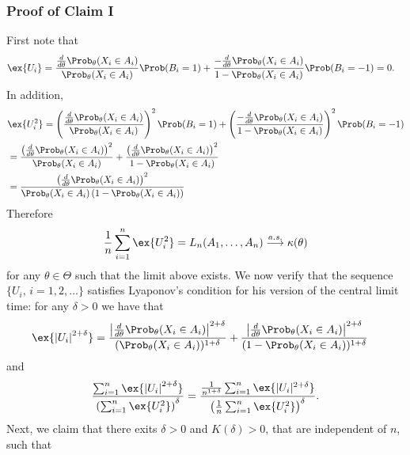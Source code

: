 \subsubsection*{Proof of Claim I}
First note that 
\begin{align*}
\ex{U_i} & = 
 \frac{\frac{d}{d\theta} \Prob_{\theta}(X_i \in A_i)}{\Prob_{\theta}(X_i \in A_i)}   \Prob (B_i=1)   + 
 \frac{-\frac{d}{d\theta} \Prob_{\theta}(X_i \in A_i)}{1-\Prob_{\theta}(X_i \in A_i)}   \Prob (B_i=-1)  = 0. 
\end{align*}
In addition,
\begin{align*}
& \ex{ U_i^2} = 
\left( \frac{\frac{d}{d\theta} \Prob_{\theta}(X_i \in A_i)}{\Prob_{\theta}(X_i \in A_i)}  \right)^2  \Prob (B_i=1)   + 
\left( \frac{-\frac{d}{d\theta} \Prob_{\theta}(X_i \in A_i)}{1-\Prob_{\theta}(X_i \in A_i)}  \right)^2 \Prob (B_i=-1) \\
& =
 \frac{ \left(\frac{d}{d\theta} \Prob_{\theta}(X_i \in A_i) \right)^2}{\Prob_{\theta}(X_i \in A_i)} +  
  \frac{ \left(\frac{d}{d\theta} \Prob_{\theta}(X_i \in A_i) \right)^2}{1-\Prob_{\theta}(X_i \in A_i)} \\
 & =  
  \frac{ \left(\frac{d}{d\theta} \Prob_{\theta}(X_i \in A_i) \right)^2}{\Prob_{\theta}(X_i \in A_i) \left(1-\Prob_{\theta}(X_i \in A_i) \right)} 
\end{align*}
Therefore
\[
\frac{1}{n} \sum_{i=1}^n \ex{ U_i^2} = L_n(A_1,\ldots,A_n) \overset{a.s.}{\longrightarrow} \kappa(\theta)
\]
for any $\theta \in \Theta$ such that the limit above exists. We now verify that the sequence $\{ U_i,\,i=1,2,\ldots \}$ satisfies Lyaponov's condition for his version of the central limit time: for any $\delta>0$ we have that 
\begin{align*}
& \ex{ \left| U_i \right|^{2+\delta} }=
 \frac{ \left| \frac{d}{d\theta} \Prob_{\theta}(X_i \in A_i) \right|^{2+\delta}} {(\Prob_{\theta}(X_i \in A_i))^{1+\delta}} +  
  \frac{ \left|\frac{d}{d\theta} \Prob_{\theta}(X_i \in A_i) \right|^{2+\delta}} {(1-\Prob_{\theta}(X_i \in A_i))^{1+\delta}} 
\end{align*}
and
\begin{equation}
\frac{\sum_{i=1}^n\ex{\left| U_i \right|^{2+\delta}} } { \left( \sum_{i=1}^n \ex{U_i^2}  \right)^\delta} = 
\frac{ \frac{1}{n^{1+\delta}} \sum_{i=1}^n \ex{ |U_i|^{2+\delta}} }{ \left(\frac{1}{n} \sum_{i=1}^n \ex{U_i^2 } \right)^\delta}. 
\label{eq:Lyaponov}
\end{equation}
Next, we claim that there exits $\delta>0$ and $K(\delta)>0$, that are independent of $n$, such that
